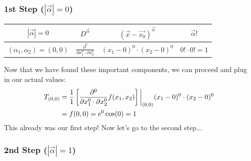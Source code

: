 \documentclass{article}
\begin{document}
	\subsubsection*{1st Step ($|\vec{\alpha}|=0$)}
	
	\begin{table}[h!]
		\centering
		\renewcommand{\arraystretch}{1.5} 
		\begin{tabular}{cccc}
			\hline
			$|\vec{\alpha}|=0$ & $D^{\vec{\alpha}}$ & $\left(\vec{x}-\vec{x_0}\right)^{\vec{\alpha}}$& $\vec{\alpha}!$\\
			\hline
			$(\alpha_1, \alpha_2)=(0, 0)$&$\frac{\partial^0}{\partial x_1^{0}\cdot \partial x_2^{0}}$& $(x_1-0)^0\cdot(x_2-0)^0$& $0!\cdot0!= 1$
		\end{tabular}
		\label{tab:taylor_example_1}
	\end{table}
	Now that we have found these important components, we can proceed and plug in our actual values: 
	\begin{align}
		T_{(0,0)}&=\frac{1}{1}\left[\frac{\partial^0}{\partial x_1^{0}\cdot \partial x_2^{0}} f(x_1, x_2)\right]\bigg{|}_{(0,0)}(x_1-0)^0\cdot(x_2-0)^0\\
		&=f(0,0)= e^{0} \cos(0) = 1
	\end{align}
	This already was our first step! Now let's go to the second step...
	
	\subsubsection*{2nd Step ($|\vec{\alpha}|=1$)}
	
\end{document}
